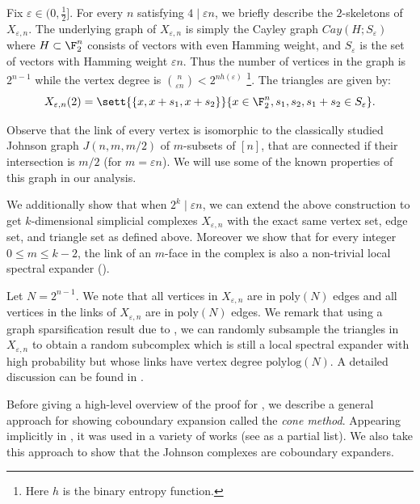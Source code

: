  Fix $\varepsilon \in (0,\frac{1}{2}]$. For every $n$ satisfying $4\;|\;\varepsilon n$, we briefly describe the $2$-skeletons of $X_{\varepsilon,n}$. The underlying graph of $X_{\varepsilon,n}$ is simply the Cayley graph $Cay(H; S_\varepsilon)$ where $H\subset \F_2^n$ consists of vectors with even Hamming weight, and $S_\varepsilon$ is the set of vectors with Hamming weight $\varepsilon n$. Thus the number of vertices in the graph is $2^{n-1}$ while the vertex degree is $\binom{n}{\varepsilon n} < 2^{nh(\varepsilon)}$ \footnote{Here $h$ is the binary entropy function.}. The triangles are given by:
\[X_{\varepsilon,n}(2) = \sett{ \{x, x+s_1, x+s_2\} }{x\in \F_2^n, s_1,s_2, s_1+s_2 \in S_\varepsilon}.\]

Observe that the link of every vertex is isomorphic to the classically studied Johnson graph \(J(n,m,m/2)\) of \(m\)-subsets of \([n]\), that are connected if their intersection is \(m/2\) (for \(m=\varepsilon n\)). We will use some of the known properties of this graph in our analysis.

We additionally show that when $2^k \;|\; \varepsilon n$, we can extend the above construction to get $k$-dimensional simplicial complexes $X_{\varepsilon,n}$ with the exact same vertex set, edge set, and triangle set as defined above. Moreover we show that for every integer $0\le m \le k-2$, the link of an $m$-face in the complex is also a non-trivial local spectral expander ().

\begin{remark}
    Let $N = 2^{n-1}$.
    We note that all vertices in $X_{\varepsilon,n}$ are in $\mathrm{poly}(N)$ edges and all vertices in the links of $X_{\varepsilon, n}$ are in $\mathrm{poly}(N)$ edges. 
    We remark that using a graph sparsification result due to \cite{ChungH07}, we can randomly subsample the triangles in $X_{\varepsilon,n}$ to obtain a random subcomplex which is still a local spectral expander with high probability but whose links have vertex degree $\mathrm{polylog}(N)$. A detailed discussion can be found in .
\end{remark}

Before giving a high-level overview of the proof for , we describe a general approach for showing coboundary expansion called the \emph{cone method}. Appearing implicitly in \cite{Gromov2010}, it was used in a variety of works (see \cite{LubotzkyMM2016,KozlovM2019,KaufmanO2021} as a partial list). We also take this approach to show that the Johnson complexes are coboundary expanders.

